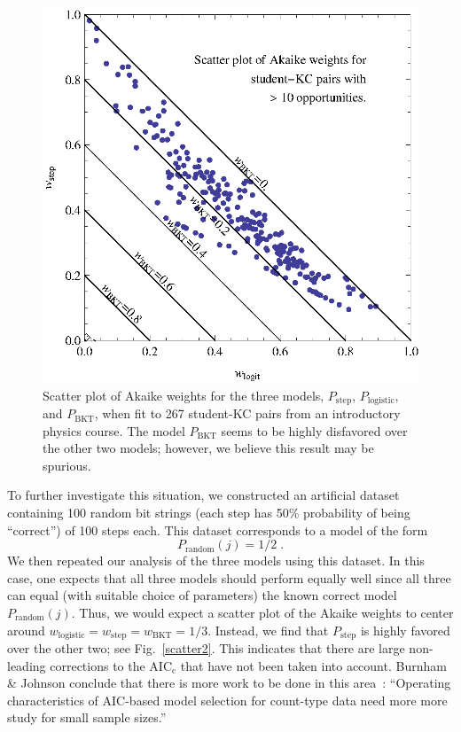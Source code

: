 \documentclass{acmlarge-edm}
\begin{document}
\begin{figure}
  \centering \includegraphics{scatter-weights.eps}
  \caption{Scatter plot of  Akaike weights for the three models, 
   $P_\mathrm{step}$, $P_\mathrm{logistic}$, and $P_\mathrm{BKT}$, 
   when fit to 267 student-KC pairs from an introductory physics course.
   The model $P_\mathrm{BKT}$ seems to be highly disfavored over
   the other two models; however, we believe this result
   may be spurious.} \label{scatter1}
\end{figure}

To further investigate this situation, we constructed an
artificial dataset containing 100 random bit strings (each
step has 50\% probability of being ``correct'') of 100 steps each.
This dataset corresponds to a model of the form
%
\begin{equation}
        P_\mathrm{random}(j)=1/2 \; .
\end{equation}
%
We then repeated our analysis of the three models using this
dataset.  In this case, one expects that all three models 
should perform equally well since all three can equal 
(with suitable choice of parameters) the known correct model 
$P_\mathrm{random}(j)$.
Thus, we would expect a scatter plot of the Akaike weights to 
center around 
$w_\mathrm{logistic}=w_\mathrm{step}=w_\mathrm{BKT}=1/3$.
Instead, we find that $P_\mathrm{step}$ is highly favored over
the other two; see Fig.~\ref{scatter2}.  
This indicates that there are large non-leading
corrections to the AIC$_\mathrm{c}$ that have not been
taken into account.  Burnham \& Johnson conclude 
that there is more work to be done in this area~\cite[p.~380]{burnham_model_2002}: 
``Operating characteristics
of AIC-based model selection for count-type data need more 
more study for small sample sizes.'' 
\end{document}

